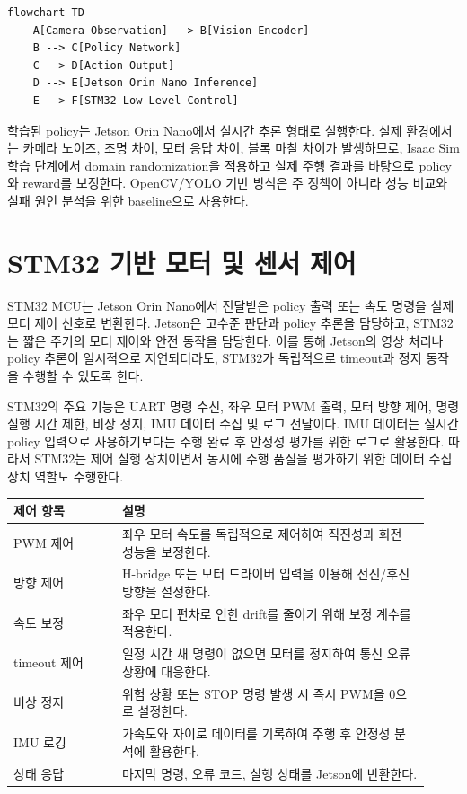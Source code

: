 \documentclass[titlepage]{pnureport}
\begin{document}
\begin{lstlisting}[language=mermaid,caption={Vision-Action Policy 구조 Mermaid 표현}]
flowchart TD
    A[Camera Observation] --> B[Vision Encoder]
    B --> C[Policy Network]
    C --> D[Action Output]
    D --> E[Jetson Orin Nano Inference]
    E --> F[STM32 Low-Level Control]
\end{lstlisting}

학습된 policy는 Jetson Orin Nano에서 실시간 추론 형태로 실행한다. 실제 환경에서는 카메라 노이즈, 조명 차이, 모터 응답 차이, 블록 마찰 차이가 발생하므로, Isaac Sim 학습 단계에서 domain randomization을 적용하고 실제 주행 결과를 바탕으로 policy와 reward를 보정한다. OpenCV/YOLO 기반 방식은 주 정책이 아니라 성능 비교와 실패 원인 분석을 위한 baseline으로 사용한다.

\section{STM32 기반 모터 및 센서 제어}

STM32 MCU는 Jetson Orin Nano에서 전달받은 policy 출력 또는 속도 명령을 실제 모터 제어 신호로 변환한다. Jetson은 고수준 판단과 policy 추론을 담당하고, STM32는 짧은 주기의 모터 제어와 안전 동작을 담당한다. 이를 통해 Jetson의 영상 처리나 policy 추론이 일시적으로 지연되더라도, STM32가 독립적으로 timeout과 정지 동작을 수행할 수 있도록 한다.

STM32의 주요 기능은 UART 명령 수신, 좌우 모터 PWM 출력, 모터 방향 제어, 명령 실행 시간 제한, 비상 정지, IMU 데이터 수집 및 로그 전달이다. IMU 데이터는 실시간 policy 입력으로 사용하기보다는 주행 완료 후 안정성 평가를 위한 로그로 활용한다. 따라서 STM32는 제어 실행 장치이면서 동시에 주행 품질을 평가하기 위한 데이터 수집 장치 역할도 수행한다.

\begin{longtable}{p{0.24\linewidth}p{0.68\linewidth}}
\toprule
제어 항목 & 설명 \\
\midrule
\endhead
PWM 제어 & 좌우 모터 속도를 독립적으로 제어하여 직진성과 회전 성능을 보정한다. \\
방향 제어 & H-bridge 또는 모터 드라이버 입력을 이용해 전진/후진 방향을 설정한다. \\
속도 보정 & 좌우 모터 편차로 인한 drift를 줄이기 위해 보정 계수를 적용한다. \\
timeout 제어 & 일정 시간 새 명령이 없으면 모터를 정지하여 통신 오류 상황에 대응한다. \\
비상 정지 & 위험 상황 또는 STOP 명령 발생 시 즉시 PWM을 0으로 설정한다. \\
IMU 로깅 & 가속도와 자이로 데이터를 기록하여 주행 후 안정성 분석에 활용한다. \\
상태 응답 & 마지막 명령, 오류 코드, 실행 상태를 Jetson에 반환한다. \\
\bottomrule
\end{longtable}
\end{document}
